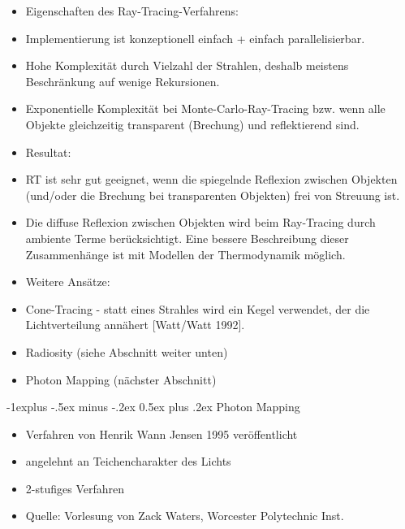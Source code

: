 \documentclass[10pt,landscape]{article}
\makeatletter
\renewcommand{\subsection}{\@startsection{subsection}{2}{0mm}%
                                {-1explus -.5ex minus -.2ex}%
                                {0.5ex plus .2ex}%
                                {\normalfont\normalsize\bfseries}}
\makeatother
\begin{document}
\begin{multicols}{3}
{\begin{itemize}
    \item Eigenschaften des Ray-Tracing-Verfahrens:
    \item Implementierung ist konzeptionell einfach + einfach parallelisierbar.
    \item Hohe Komplexität durch Vielzahl der Strahlen, deshalb meistens Beschränkung auf wenige Rekursionen.
    \item Exponentielle Komplexität bei Monte-Carlo-Ray-Tracing bzw. wenn alle Objekte gleichzeitig transparent (Brechung) und reflektierend sind.
    \item Resultat:
    \item RT ist sehr gut geeignet, wenn die spiegelnde Reflexion zwischen Objekten (und/oder die Brechung bei transparenten Objekten) frei von Streuung ist.
    \item Die diffuse Reflexion zwischen Objekten wird beim Ray-Tracing durch ambiente Terme berücksichtigt. Eine bessere Beschreibung dieser Zusammenhänge ist mit Modellen der Thermodynamik möglich.
    \item Weitere Ansätze:
    \item Cone-Tracing - statt eines Strahles wird ein Kegel verwendet, der die Lichtverteilung annähert [Watt/Watt 1992].
    \item Radiosity (siehe Abschnitt weiter unten)
    \item Photon Mapping (nächster Abschnitt)
  \end{itemize}
  
  \subsection{ Photon Mapping}
  \begin{itemize}
    \item Verfahren von Henrik Wann Jensen 1995 veröffentlicht
    \item angelehnt an Teichencharakter des Lichts
    \item 2-stufiges Verfahren
    \item Quelle: Vorlesung von Zack Waters, Worcester Polytechnic Inst.
  \end{itemize}
  
  
}
\end{multicols}
\end{document}
